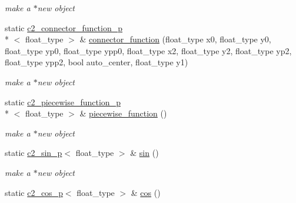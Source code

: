 \begin{DoxyCompactItemize}
\begin{DoxyCompactList}\small\item\em make a $\ast$new object \end{DoxyCompactList}\item 
\hypertarget{classc2__factory_a8424d3a67d8e0cbe25f8ad8499da3cd7}{static \hyperlink{classc2__connector__function__p}{c2\-\_\-connector\-\_\-function\-\_\-p}\\*
$<$ float\-\_\-type $>$ \& \hyperlink{classc2__factory_a8424d3a67d8e0cbe25f8ad8499da3cd7}{connector\-\_\-function} (float\-\_\-type x0, float\-\_\-type y0, float\-\_\-type yp0, float\-\_\-type ypp0, float\-\_\-type x2, float\-\_\-type y2, float\-\_\-type yp2, float\-\_\-type ypp2, bool auto\-\_\-center, float\-\_\-type y1)}\label{classc2__factory_a8424d3a67d8e0cbe25f8ad8499da3cd7}

\begin{DoxyCompactList}\small\item\em make a $\ast$new object \end{DoxyCompactList}\item 
\hypertarget{classc2__factory_ae8073f403ae804870d8ce71e67175507}{static \hyperlink{classc2__piecewise__function__p}{c2\-\_\-piecewise\-\_\-function\-\_\-p}\\*
$<$ float\-\_\-type $>$ \& \hyperlink{classc2__factory_ae8073f403ae804870d8ce71e67175507}{piecewise\-\_\-function} ()}\label{classc2__factory_ae8073f403ae804870d8ce71e67175507}

\begin{DoxyCompactList}\small\item\em make a $\ast$new object \end{DoxyCompactList}\item 
\hypertarget{classc2__factory_a866854d4fdd6c6678512151dbcd635a5}{static \hyperlink{classc2__sin__p}{c2\-\_\-sin\-\_\-p}$<$ float\-\_\-type $>$ \& \hyperlink{classc2__factory_a866854d4fdd6c6678512151dbcd635a5}{sin} ()}\label{classc2__factory_a866854d4fdd6c6678512151dbcd635a5}

\begin{DoxyCompactList}\small\item\em make a $\ast$new object \end{DoxyCompactList}\item 
\hypertarget{classc2__factory_abc5ea51417ecef590629a39f7a2227e4}{static \hyperlink{classc2__cos__p}{c2\-\_\-cos\-\_\-p}$<$ float\-\_\-type $>$ \& \hyperlink{classc2__factory_abc5ea51417ecef590629a39f7a2227e4}{cos} ()}\label{classc2__factory_abc5ea51417ecef590629a39f7a2227e4}


\end{DoxyCompactItemize}
